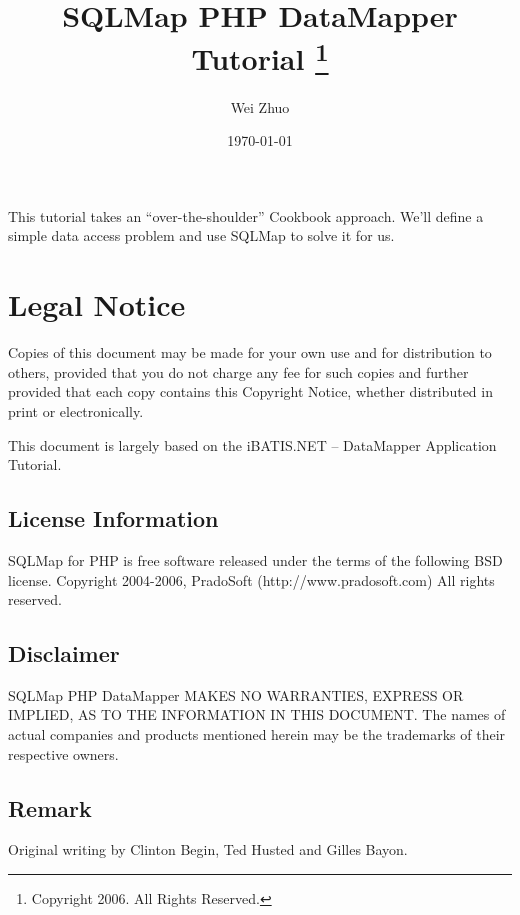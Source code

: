 \documentclass{article}
\title{\vspace{-2.5cm} \bfseries SQLMap PHP DataMapper Tutorial
    \thanks{Copyright 2006. All Rights Reserved.}
}
\author{Wei Zhuo}
\date{\today}
\begin{document}
\maketitle

This tutorial takes an ``over-the-shoulder'' Cookbook approach. We'll define a
simple data access problem and use SQLMap to solve it for us.


\section*{Legal Notice}

Copies of this document may be made for your own use and for distribution to
others, provided that you do not charge any fee for such copies and further
provided that each copy contains this Copyright Notice, whether distributed in
print or electronically.

This document is largely based on the iBATIS.NET -- DataMapper Application
Tutorial.

\subsection*{License Information}
SQLMap for PHP is free software released under the terms of the following BSD
license. Copyright 2004-2006, PradoSoft (http://www.pradosoft.com) All rights
reserved.

\subsection*{Disclaimer}
SQLMap PHP DataMapper MAKES NO WARRANTIES, EXPRESS OR IMPLIED, AS TO THE
INFORMATION IN THIS DOCUMENT. The names of actual companies and products
mentioned herein may be the trademarks of their respective owners.

\subsection*{Remark}
Original writing by Clinton Begin, Ted Husted and Gilles Bayon.




\end{document}
